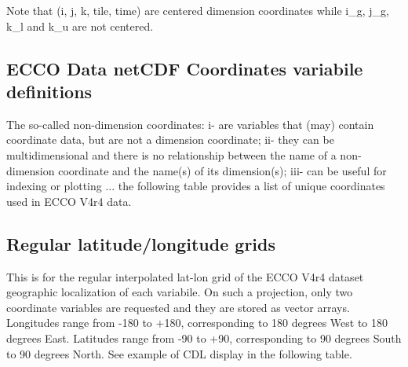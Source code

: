 \par Note that (i, j, k, tile, time) are centered dimension coordinates while i\_g, j\_g, k\_l and k\_u are not centered.

\newpage

\subsection{ECCO Data netCDF Coordinates variabile definitions}
The so-called non-dimension coordinates: i- are variables that (may) contain coordinate data, but are not a dimension coordinate; ii- they can be multidimensional and there is no relationship between the name of a non-dimension coordinate and the name(s) of its dimension(s); iii- can be useful for indexing or plotting ... the following table provides a list of unique coordinates used in ECCO V4r4 data.


\subsection*{Regular latitude/longitude grids}
\par This is for the regular interpolated lat-lon grid of the ECCO V4r4 dataset geographic localization of each variabile. On such a projection, only two coordinate variables are requested and they are stored as vector arrays. Longitudes range from -180 to +180, corresponding to 180 degrees West to 180 degrees East. Latitudes range from -90 to +90, corresponding to 90 degrees South to 90 degrees North. See example of CDL display in the following table.

